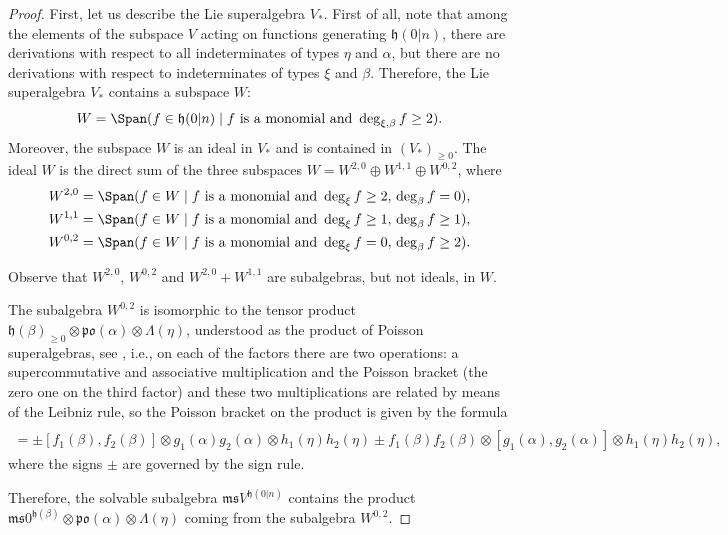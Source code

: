 \documentclass[pdftex]{sigma}
\newcommand {\fh} {{\mathfrak{h}}}
\newcommand {\fm} {{\mathfrak{m}}}
\newcommand {\fpo} {{\mathfrak{po}}}
\newcommand {\fs} {{\mathfrak{s}}}
\newcommand {\<} [2] {{\left.\vphantom{#2}\right.^{#1\!}\!{#2}}}
\numberwithin{equation}{section}
\begin{document}
\begin{proof} First, let us describe the Lie superalgebra $V_*$. First of all, note that among the elements of the subspace $V$ acting on functions generating $\fh(0|n)$, there are derivations with respect to all indeterminates of types $\eta$ and $\alpha$, but there are no derivations with respect to indeterminates of types $\xi$ and $\beta$. Therefore, the Lie superalgebra $V_*$ contains a subspace $W$:
\[
W=\Span(f\in \fh(0|n)\mid f   \ \text{is a monomial and} \ \deg_{\xi,\beta}f\ge 2).
\]
Moreover, the subspace $W$ is an ideal in $V_*$ and is contained in $(V_*)_{\ge 0}$. The ideal $W$ is the direct sum of the three subspaces $W=W^{2,0}\oplus W^{1,1}\oplus W^{0,2}$, where
\begin{gather*}
W^{2,0}=\Span(f\in W\mid f\   \text{is a monomial and}\   \deg_\xi f\ge 2,\, \deg_\beta f=0),\\
W^{1,1}=\Span(f\in W\mid f \   \text{is a monomial and}\  \deg_\xi f\ge 1, \,\deg_\beta f\ge 1),\\
W^{0,2}=\Span(f\in W\mid f\   \text{is a monomial and}\   \deg_\xi f=0,\, \deg_\beta f\ge 2).
\end{gather*}

Observe that $W^{2, 0}$, $W^{0,2}$ and $W^{2,0}+W^{1,1}$ are subalgebras, but not ideals, in $W$.

The subalgebra $W^{0,2}$ is isomorphic to the tensor product $\fh(\beta)_{\ge 0}\otimes \fpo(\alpha) \otimes \Lambda(\eta)$, understood as the product of Poisson superalgebras, see \cite{Z}, i.e., on each of the factors there are two operations: a supercommutative and associative multiplication and the Poisson bracket (the zero one on the third factor) and these two multiplications are related by means of the Leibniz rule, so the Poisson bracket on the product is given by the formula{\samepage
\begin{gather*}
[f_1(\beta)\otimes g_1(\alpha)\otimes h_1(\eta),   f_2(\beta)\otimes g_2(\alpha)\otimes h_2(\eta)]\\
=
\pm [f_1(\beta),f_2(\beta)]\otimes g_1(\alpha)g_2(\alpha)\otimes h_1(\eta)h_2(\eta) \pm f_1(\beta)f_2(\beta)\otimes[g_1(\alpha), g_2(\alpha)]\otimes h_1(\eta)h_2(\eta),
\end{gather*}
where the signs $\pm$ are governed by the sign rule.}

Therefore, the solvable subalgebra $\fm\fs V^{\fh(0|n)}$ contains the product $\fm\fs 0^{\fh(\beta)}\otimes \fpo(\alpha)\otimes \Lambda(\eta)$ coming from the subalgebra $W^{0,2}$.


\end{proof}
\end{document}
